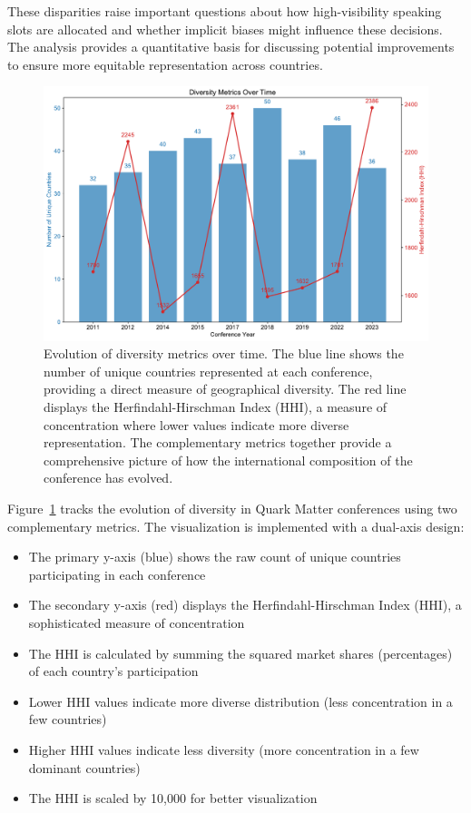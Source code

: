 \documentclass[a4paper,11pt]{article}
\begin{document}
These disparities raise important questions about how high-visibility speaking slots are allocated and whether implicit biases might influence these decisions. The analysis provides a quantitative basis for discussing potential improvements to ensure more equitable representation across countries.

\begin{figure}[H]
\centering
\includegraphics[width=\textwidth]{figures/diversity_metrics.pdf}
\caption{Evolution of diversity metrics over time. The blue line shows the number of unique countries represented at each conference, providing a direct measure of geographical diversity. The red line displays the Herfindahl-Hirschman Index (HHI), a measure of concentration where lower values indicate more diverse representation. The complementary metrics together provide a comprehensive picture of how the international composition of the conference has evolved.}
\label{fig:diversity_metrics}
\end{figure}

Figure~\ref{fig:diversity_metrics} tracks the evolution of diversity in Quark Matter conferences using two complementary metrics. The visualization is implemented with a dual-axis design:

\begin{itemize}
    \item The primary y-axis (blue) shows the raw count of unique countries participating in each conference
    \item The secondary y-axis (red) displays the Herfindahl-Hirschman Index (HHI), a sophisticated measure of concentration
    \item The HHI is calculated by summing the squared market shares (percentages) of each country's participation
    \item Lower HHI values indicate more diverse distribution (less concentration in a few countries)
    \item Higher HHI values indicate less diversity (more concentration in a few dominant countries)
    \item The HHI is scaled by 10,000 for better visualization
\end{itemize}
\end{document}
